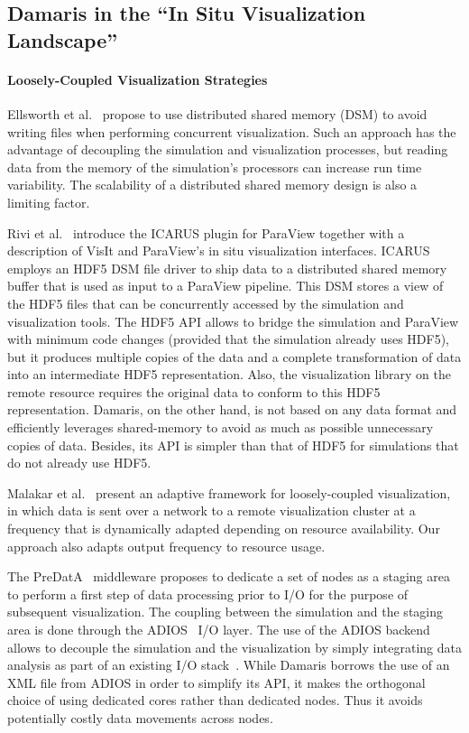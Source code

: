 \subsection{Damaris in the ``In Situ Visualization Landscape''}

\paragraph{Loosely-Coupled Visualization Strategies}
Ellsworth et al.~\cite{ellsworth2006concurrent} propose to use distributed shared memory 
(DSM) to avoid writing files when performing concurrent visualization. Such an 
approach has the advantage of decoupling the simulation and visualization 
processes, but reading data from the memory of the simulation's processors can 
increase run time variability. The scalability
of a distributed shared memory design is also a limiting factor.

Rivi et al.~\cite{rivi2011insitu} introduce the ICARUS plugin for ParaView together with a 
description of VisIt and ParaView's in situ visualization interfaces. ICARUS employs an 
HDF5 DSM file driver to ship data to a distributed shared memory buffer that is
used as input to a ParaView pipeline. This DSM stores a view of the HDF5 
files that can be concurrently accessed by the simulation and visualization tools.
The HDF5 API allows to bridge the simulation and 
ParaView with minimum code changes (provided that the simulation already uses HDF5),
but it produces multiple copies of the data and a complete transformation of data
into an intermediate HDF5 representation.
Also, the visualization library on the remote resource requires the original data 
to conform to this HDF5 representation. Damaris, on the other hand, is not based
on any data format and efficiently leverages shared-memory to avoid as much as possible
unnecessary copies of data. Besides, its API is simpler than that of HDF5 for simulations
that do not already use HDF5.

Malakar et al.~\cite{malakar2010adaptive} present an adaptive framework for 
loosely-coupled visualization, in which data is sent over a network to a remote 
visualization cluster at a frequency that is dynamically adapted depending on resource availability. 
Our approach also adapts output frequency to resource usage.

The PreDatA~\cite{zheng2010predata} middleware proposes to dedicate a set of nodes as a 
staging area to perform a first step of data processing prior to I/O for the 
purpose of subsequent visualization. The coupling between the simulation and the
staging area is done through the ADIOS~\cite{lofstead2008flexible} I/O layer. 
The use of the ADIOS backend allows to decouple the simulation and the visualization by
simply integrating data analysis as part of an existing I/O stack~\cite{zheng2011highend}.
While Damaris borrows the use of an XML file from ADIOS in order to simplify its API,
it makes the orthogonal choice of using dedicated cores rather than dedicated nodes.
Thus it avoids potentially costly data movements across nodes.

